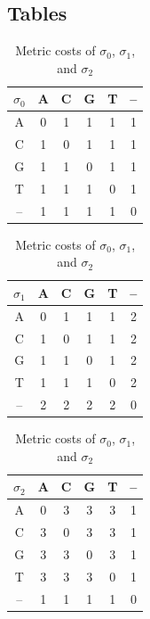 \documentclass{bmcart}
\begin{document}
\begin{backmatter}
    \section*{Tables}
    \begin{table}[!hbt]
    	\caption{Metric costs of $\sigma_0$, $\sigma_1$, and $\sigma_2$}
    	\label{Tab:Metrics}
    	\begin{minipage}{0.3\textwidth}
    		\centering
    		\begin{tabular}{c|ccccc}
    			$\sigma_0$ & A & C & G & T & -- \\ \hline
    			A  & 0 & 1 & 1 & 1 & 1  \\
    			C  & 1 & 0 & 1 & 1 & 1  \\
    			G  & 1 & 1 & 0 & 1 & 1  \\
    			T  & 1 & 1 & 1 & 0 & 1  \\
    			-- & 1 & 1 & 1 & 1 & 0
    		\end{tabular}
    	\end{minipage}
    	\hfill
    	\begin{minipage}{0.33\textwidth}
    		\centering
    		\begin{tabular}{c|ccccc}
    			$\sigma_1$ & A & C & G & T & -- \\ \hline
    			A  & 0 & 1 & 1 & 1 & 2  \\
    			C  & 1 & 0 & 1 & 1 & 2  \\
    			G  & 1 & 1 & 0 & 1 & 2  \\
    			T  & 1 & 1 & 1 & 0 & 2  \\
    			-- & 2 & 2 & 2 & 2 & 0
    		\end{tabular}
    	\end{minipage}
    	\hfill
    	\begin{minipage}{0.3\textwidth}
    		\centering
    		\begin{tabular}{c|ccccc}
    			$\sigma_2$ & A & C & G & T & -- \\ \hline
    			A  & 0 & 3 & 3 & 3 & 1  \\
    			C  & 3 & 0 & 3 & 3 & 1  \\
    			G  & 3 & 3 & 0 & 3 & 1  \\
    			T  & 3 & 3 & 3 & 0 & 1  \\
    			-- & 1 & 1 & 1 & 1 & 0
    		\end{tabular}
    	\end{minipage}
    \end{table}
    

\end{backmatter}
\end{document}
